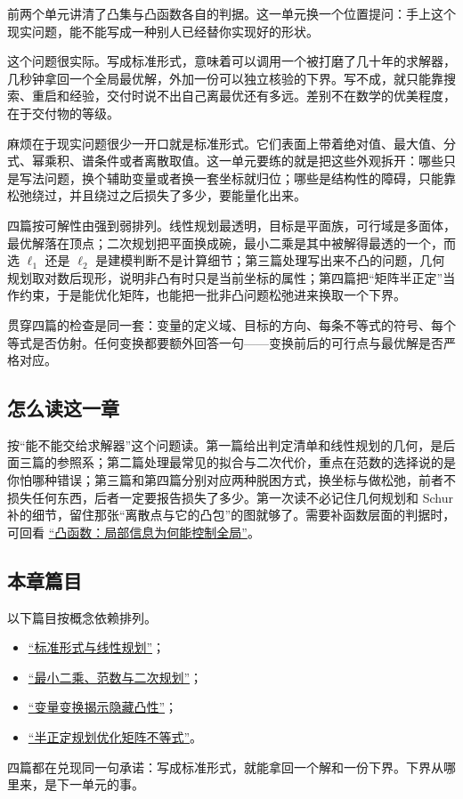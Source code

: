 前两个单元讲清了凸集与凸函数各自的判据。这一单元换一个位置提问：手上这个现实问题，能不能写成一种别人已经替你实现好的形状。

这个问题很实际。写成标准形式，意味着可以调用一个被打磨了几十年的求解器，几秒钟拿回一个全局最优解，外加一份可以独立核验的下界。写不成，就只能靠搜索、重启和经验，交付时说不出自己离最优还有多远。差别不在数学的优美程度，在于交付物的等级。

麻烦在于现实问题很少一开口就是标准形式。它们表面上带着绝对值、最大值、分式、幂乘积、谱条件或者离散取值。这一单元要练的就是把这些外观拆开：哪些只是写法问题，换个辅助变量或者换一套坐标就归位；哪些是结构性的障碍，只能靠松弛绕过，并且绕过之后损失了多少，要能量化出来。

四篇按可解性由强到弱排列。线性规划最透明，目标是平面族，可行域是多面体，最优解落在顶点；二次规划把平面换成碗，最小二乘是其中被解得最透的一个，而选 \(\ell_1\) 还是 \(\ell_2\) 是建模判断不是计算细节；第三篇处理写出来不凸的问题，几何规划取对数后现形，说明非凸有时只是当前坐标的属性；第四篇把``矩阵半正定''当作约束，于是能优化矩阵，也能把一批非凸问题松弛进来换取一个下界。

贯穿四篇的检查是同一套：变量的定义域、目标的方向、每条不等式的符号、每个等式是否仿射。任何变换都要额外回答一句——变换前后的可行点与最优解是否严格对应。

\subsection{怎么读这一章}

按``能不能交给求解器''这个问题读。第一篇给出判定清单和线性规划的几何，是后面三篇的参照系；第二篇处理最常见的拟合与二次代价，重点在范数的选择说的是你怕哪种错误；第三篇和第四篇分别对应两种脱困方式，换坐标与做松弛，前者不损失任何东西，后者一定要报告损失了多少。第一次读不必记住几何规划和 Schur 补的细节，留住那张``离散点与它的凸包''的图就够了。需要补函数层面的判据时，可回看 \hyperref[ch:073]{``凸函数：局部信息为何能控制全局''}。

\subsection{本章篇目}

以下篇目按概念依赖排列。

\begin{itemize}
\tightlist
\item \hyperref[sec:09-Convex-Optimization/04-Convex-Problems/01]{``标准形式与线性规划''}；
\item \hyperref[sec:09-Convex-Optimization/04-Convex-Problems/02]{``最小二乘、范数与二次规划''}；
\item \hyperref[sec:09-Convex-Optimization/04-Convex-Problems/03]{``变量变换揭示隐藏凸性''}；
\item \hyperref[sec:09-Convex-Optimization/04-Convex-Problems/04]{``半正定规划优化矩阵不等式''}。
\end{itemize}

四篇都在兑现同一句承诺：写成标准形式，就能拿回一个解和一份下界。下界从哪里来，是下一单元的事。
